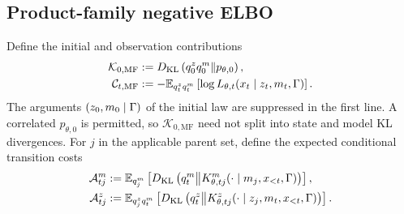 \subsection{Product-family negative ELBO}

Define the initial and observation contributions
\begin{equation}
\begin{aligned}
\mathcal K_{0,\mathrm{MF}}
&:=D_{\mathrm{KL}}\left(
q_0^zq_0^m
\middle\Vert
p_{\theta,0}
\right),\\
\mathcal C_{t,\mathrm{MF}}
&:=-\mathbb E_{q_t^zq_t^m}
\left[
\log L_{\theta,t}(x_t\mid z_t,m_t,\Gamma)
\right].
\end{aligned}
\label{eq:mean-field-initial-observation-costs}
\end{equation}
The arguments $(z_0,m_0\mid\Gamma)$ of the initial law are suppressed in the first line. A correlated $p_{\theta,0}$ is permitted, so $\mathcal K_{0,\mathrm{MF}}$ need not split into state and model KL divergences. For $j$ in the applicable parent set, define the expected conditional transition costs
\begin{equation}
\begin{aligned}
\mathcal A_{tj}^m
:={}&\mathbb E_{q_j^m}
\left[
D_{\mathrm{KL}}\left(
q_t^m
\middle\Vert
K^m_{\theta,tj}(\mathord{\cdot}\mid m_j,x_{<t},\Gamma)
\right)
\right],\\
\mathcal A_{tj}^z
:={}&\mathbb E_{q_j^zq_t^m}
\left[
D_{\mathrm{KL}}\left(
q_t^z
\middle\Vert
K^z_{\theta,tj}(\mathord{\cdot}\mid z_j,m_t,x_{<t},\Gamma)
\right)
\right].
\end{aligned}
\label{eq:mean-field-expected-transition-costs}
\end{equation}

